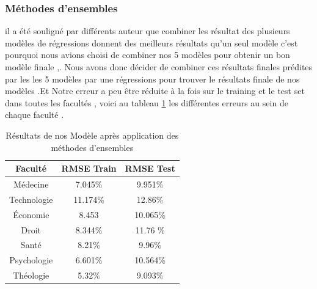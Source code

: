\subsubsection{Méthodes d'ensembles}
il a été souligné par différents auteur \cite{bookSckit-Learn} que combiner les résultat des plusieurs modèles de régressions donnent des meilleurs résultats qu'un seul modèle c'est pourquoi nous avions choisi de combiner nos 5 modèles pour obtenir un bon modèle finale ,.
Nous avons donc décider de combiner ces résultats finales prédites par les  les 5 modèles par une régressions pour trouver le résultats finale de nos modèles .Et Notre erreur a peu être réduite à la fois sur le training et le test set dans toutes les facultés , voici au tableau \ref{tab:ensembleResults} les différentes erreurs au sein de chaque faculté .
\begin{table}[!htbp]
\centering
\begingroup %
\captionsetup{type=table} %
\caption{Résultats de nos Modèle après application des méthodes d'ensembles }
\label{tab:ensembleResults}
\begin{tabular}{|c|c|c|}
	\toprule
	Faculté &   RMSE Train  &RMSE Test \\
	\midrule
	Médecine &7.045\%&9.951\%\\
	Technologie&11.174\%&12.86\%\\
	Économie &8.453& 10.065\%\\
	Droit &8.344\%&11.76 \%\\
	Santé&8.21\%&9.96\%\\
	Psychologie&6.601\%&10.564\%\\
	Théologie&5.32\%&9.093\% \\
	\bottomrule
\end{tabular}
\endgroup
\end{table}
